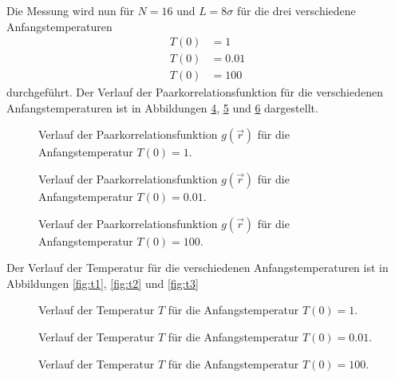 Die Messung wird nun für $N = 16$ und $L = 8 \sigma$ für die drei verschiedene Anfangstemperaturen 
\begin{align*}
    T(0) &= 1 \\
    T(0) &= 0.01 \\
    T(0) &= 100 
\end{align*}
durchgeführt.
Der Verlauf der Paarkorrelationsfunktion für die verschiedenen Anfangstemperaturen ist in Abbildungen \ref{fig:p1}, \ref{fig:p2} und \ref{fig:p3}
dargestellt.
\FloatBarrier
\begin{figure}[H]
    \centering
    \caption{Verlauf der Paarkorrelationsfunktion $g(\vec{r})$ für die Anfangstemperatur $T(0) = 1$.}
    \label{fig:p1}
\end{figure}
\FloatBarrier
\noindent
\FloatBarrier
\begin{figure}[H]
    \centering
    \caption{Verlauf der Paarkorrelationsfunktion $g(\vec{r})$ für die Anfangstemperatur $T(0) = 0.01$.}
    \label{fig:p2}
\end{figure}
\FloatBarrier
\noindent
\FloatBarrier
\begin{figure}[H]
    \centering
    \caption{Verlauf der Paarkorrelationsfunktion $g(\vec{r})$ für die Anfangstemperatur $T(0) = 100$.}
    \label{fig:p3}
\end{figure}
\FloatBarrier
\noindent
Der Verlauf der Temperatur für die verschiedenen Anfangstemperaturen ist in Abbildungen \ref{fig:t1}, \ref{fig:t2} und \ref{fig:t3}
\FloatBarrier
\begin{figure}[H]
    \centering
    \caption{Verlauf der Temperatur $T$ für die Anfangstemperatur $T(0) = 1$.}
    \label{fig:p1}
\end{figure}
\FloatBarrier
\noindent
\FloatBarrier
\begin{figure}[H]
    \centering
    \caption{Verlauf der Temperatur $T$ für die Anfangstemperatur $T(0) = 0.01$.}
    \label{fig:p2}
\end{figure}
\FloatBarrier
\noindent
\FloatBarrier
\begin{figure}[H]
    \centering
    \caption{Verlauf der Temperatur $T$ für die Anfangstemperatur $T(0) = 100$.}
    \label{fig:p3}
\end{figure}
\FloatBarrier
\noindent


